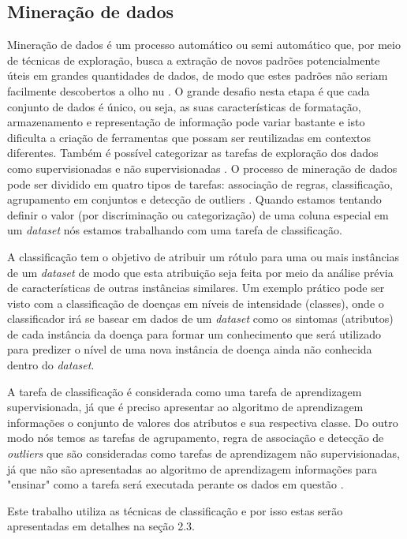 \subsection{Mineração de dados}

Mineração de dados é um processo automático ou semi automático que, por meio de técnicas de exploração, busca a extração de novos padrões potencialmente úteis em grandes quantidades de dados, de modo que estes padrões não seriam facilmente descobertos a olho nu \cite{Fayyad1996,Witten2016}. O grande desafio nesta etapa é que cada conjunto de dados é único, ou seja, as suas características de formatação, armazenamento e representação de informação pode variar bastante e isto dificulta a criação de ferramentas que possam ser reutilizadas em contextos diferentes. Também é possível categorizar  as tarefas de exploração dos dados como supervisionadas e não supervisionadas \cite{Aggarwal2015}. O processo de mineração de dados pode ser dividido em quatro tipos de tarefas: associação de regras, classificação, agrupamento em conjuntos e  detecção de outliers \cite{Aggarwal2015}. Quando estamos tentando definir o valor (por discriminação ou categorização) de uma coluna especial em um \emph{dataset} nós estamos trabalhando com uma tarefa de classificação.

A classificação tem o objetivo de atribuir um rótulo para uma ou mais instâncias de um \emph{dataset} de modo que esta atribuição seja feita por meio da análise prévia de características de outras instâncias similares. Um exemplo prático pode ser visto com a classificação de doenças em níveis de intensidade (classes), onde o classificador irá se basear em dados de um \emph{dataset} como os sintomas (atributos) de cada instância da doença para formar um conhecimento que será utilizado para predizer o nível de uma nova instância de doença ainda não conhecida dentro do \emph{dataset}.

A tarefa de classificação é considerada como uma tarefa de aprendizagem supervisionada, já que é preciso apresentar ao algoritmo de aprendizagem informações o conjunto de valores dos atributos e sua respectiva classe. Do outro modo nós temos as tarefas de agrupamento, regra de associação e detecção de \emph{outliers} que são consideradas como tarefas de aprendizagem não supervisionadas, já que não são apresentadas ao algoritmo de aprendizagem informações para "ensinar" como a tarefa será executada perante os dados em questão \cite{Aggarwal2015}.

Este trabalho utiliza as técnicas de classificação e por isso estas serão apresentadas em detalhes na seção 2.3.


